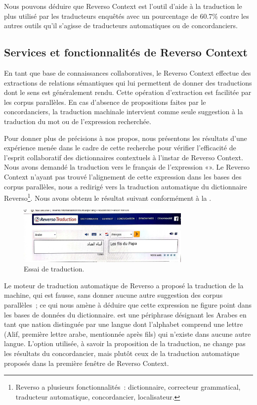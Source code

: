 \documentclass{textolivre}
\begin{document}
Nous pouvons déduire que Reverso Context est l’outil d’aide à la traduction le plus utilisé par les traducteurs enquêtés avec un pourcentage de 60.7\% contre les autres outils qu’il s’agisse de traducteurs automatiques ou de concordanciers. 


\subsection{Services et fonctionnalités de Reverso Context}\label{sec-services}
En tant que base de connaissances collaboratives, le Reverso Context effectue des extractions de relations sémantiques qui lui permettent de donner des traductions dont le sens est généralement rendu. Cette opération d’extraction est facilitée par les corpus parallèles. En cas d’absence de propositions faites par le concordanciers, la traduction machinale intervient comme seule suggestion à la traduction du mot ou de l’expression recherchée.

Pour donner plus de précisions à nos propos, nous présentons les résultats d’une expérience menée dans le cadre de cette recherche pour vérifier l’efficacité de l’esprit collaboratif des dictionnaires contextuels à l’instar de Reverso Context. Nous avons demandé la traduction vers le français de l’expression «».
Le Reverso Context n’ayant pas trouvé l’alignement de cette expression dans les bases des corpus parallèles, nous a redirigé vers la traduction automatique du dictionnaire 
Reverso\footnote{
Reverso a plusieurs fonctionnalités : dictionnaire, correcteur grammatical, traducteur automatique, concordancier, localisateur.
}. Nous avons obtenu le résultat suivant conformément à la . 

\begin{figure}[htbp]
 \centering
 \includegraphics[width=0.75\textwidth]{figure05.pdf}
 \caption{Essai de traduction.}
 \label{fig-05}
\end{figure}

Le moteur de traduction automatique de Reverso a proposé la traduction de la machine, qui est fausse, sans donner aucune autre suggestion des corpus parallèles ; ce qui nous amène à déduire que cette expression ne figure point dans les bases de données du dictionnaire.
est une périphrase désignant les Arabes en tant que nation distinguée par une langue dont l’alphabet comprend une lettre (Alif, première lettre arabe, mentionnée après fils) qui n’existe dans aucune autre langue. L’option utilisée, à savoir la proposition de la traduction, ne change pas les résultats du concordancier, mais plutôt ceux de la traduction automatique proposés dans la première fenêtre de Reverso Context.
\end{document}
